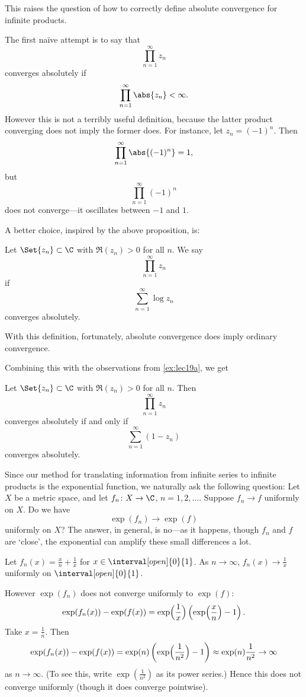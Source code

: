 This raises the question of how to correctly define absolute convergence for infinite products.

The first naïve attempt is to say that
\[
	\prod_{n = 1}^\infty z_n
\]
converges absolutely if
\[
	\prod_{n = 1}^\infty \abs{z_n} < \infty.
\]
However this is not a terribly useful definition, because the latter product converging does not imply the former does.
For instance, let $z_n = (-1)^n$.
Then
\[
	\prod_{n = 1}^\infty \abs{(-1)^n} = 1,
\]
but
\[
	\prod_{n = 1}^\infty (-1)^n
\]
does not converge---it oscillates between $-1$ and $1$.

A better choice, inspired by the above proposition, is:

\begin{definition}
	Let $\Set{z_n} \subset \C$ with $\Re(z_n) > 0$ for all $n$.
	We say
	\[
		\prod_{n = 1}^\infty z_n
	\]
	 if
	\[
		\sum_{n = 1}^\infty \log z_n
	\]
	converges absolutely.
\end{definition}

With this definition, fortunately, absolute convergence does imply ordinary convergence.

Combining this with the observations from \autoref{ex:lec19a}, we get

\begin{corollary}\label{cor8.2}
	Let $\Set{z_n} \subset \C$ with $\Re(z_n) > 0$ for all $n$.
	Then
	\[
		\prod_{n = 1}^\infty z_n
	\]
	converges absolutely if and only if
	\[
		\sum_{n = 1}^\infty (1 - z_n)
	\]
	converges absolutely.
\end{corollary}

Since our method for translating information from infinite series to infinite products is the exponential function, we naturally ask the following question:
Let $X$ be a metric space, and let $f_n \colon X \to \C$, $n = 1, 2, \dots$.
Suppose $f_n \to f$ uniformly on $X$.
Do we have
\[
	\exp(f_n) \to \exp(f)
\]
uniformly on $X$?
The answer, in general, is no---as it happens, though $f_n$ and $f$ are `close', the exponential can amplify these small differences a lot.

\begin{counterexample}
	Let $f_n(x) = \frac{x}{n} + \frac{1}{x}$ for $x \in \interval[open]{0}{1}$.
	As $n \to \infty$, $f_n(x) \to \frac{1}{x}$ uniformly on $\interval[open]{0}{1}$.

	However $\exp(f_n)$ does not converge uniformly to $\exp(f)$:
	\[
		\exp(f_n(x)) - \exp(f(x)) = \exp\Bigl ( \frac{1}{x} \Bigr ) \left ( \exp\Bigl( \frac{x}{n} \Bigr) - 1 \right ).
	\]
	Take $x = \frac{1}{n}$.
	Then
	\[
		\exp(f_n(x)) - \exp(f(x)) = \exp(n) \left ( \exp\Bigl( \frac{1}{n^2} \Bigr) - 1 \right ) \approx \exp(n) \frac{1}{n^2} \to \infty
	\]
	as $n \to \infty$.
	(To see this, write $\exp(\frac{1}{n^2})$ as its power series.)
	Hence this does not converge uniformly (though it does converge pointwise).
\end{counterexample}

